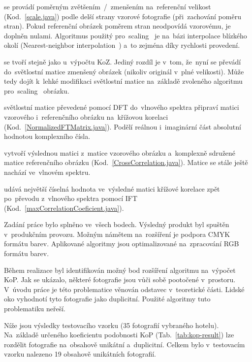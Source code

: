  se provádí poměrným zvětšením~/~zmenšením na~referenční velikost (Kod.~\ref{scale.java}) podle delší strany vzorové fotografie (při~zachování poměru stran). Pokud referenční obrázek poměrem stran neodpovídá vzorovému, je doplněn nulami. Algoritmus použitý pro~scaling~\cite{scaling} je na~bázi interpolace blízkého okolí (Nearest-neighbor interpolation~\cite{nearest-neighbor-interpolation}) a~to zejména díky rychlosti provedení.

 se tvoří stejně jako u~výpočtu KoZ. Jediný rozdíl je v~tom, že~nyní se převádí do~světlostní matice zmenšený obrázek (nikoliv originál v~plné velikosti). Může tedy dojít k~lehké modifikaci světlostní matice na~základě zvoleného algoritmu pro~scaling~\cite{scaling} obrázku.

 světlostní matice převedené pomocí DFT do~vlnového spektra připraví matici vzorového i~referenčního obrázku na~křížovou korelaci (Kod.~\ref{NormalizedFTMatrix.java}). Podělí reálnou i~imaginární část absolutní hodnotou komplexního čísla.

 vytvoří výslednou matici z~matice vzorového obrázku a~komplexně sdružené matice referenčního obrázku (Kod.~\ref{CrossCorrelation.java}). Matice se stále ještě nachází ve~vlnovém spektru.

udává největší číselná hodnota ve~výsledné matici křížové korelace zpět po~převodu z~vlnového spektra pomocí IFT (Kod.~\ref{maxCorrelationCoeficient.java}).


Zadání práce bylo splněno ve~všech bodech. Výsledný produkt byl spuštěn v~produkčním provozu. Možným námětem na~rozšíření je podpora CMYK~\cite{cmyk} formátu barev. Aplikované algoritmy jsou optimalizované na~zpracování RGB formátu barev.

Během realizace byl identifikován možný bod rozšíření algoritmu na~výpočet KoP. Jak se ukázalo, některé fotografie jsou vůči sobě pootočené v~prostoru. V~úvodu práce je této problematice věnován odstavec v~teoretické části. Lidské oko vyhodnotí tyto fotografie jako duplicitní. Použité algoritmy tuto problematiku neřeší.

Níže jsou výsledky testovacího vzorku (35 fotografií vybraného hotelu). Na~základě určeného koeficientu podobnosti KoP (Tab.~\ref{tab:kop-result}) lze rozdělit fotografie na~obsahově unikátní a~duplicitní. Celkem bylo v~testovacím vzorku nalezeno 19 obsahově unikátních fotografií.

